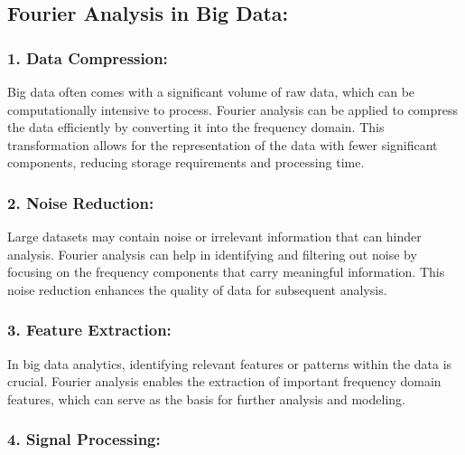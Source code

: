 \documentclass[11pt]{article}
\begin{document}
\hypertarget{fourier-analysis-in-big-data}{%
\subsection{Fourier Analysis in Big
Data:}\label{fourier-analysis-in-big-data}}

\hypertarget{data-compression}{%
\subsubsection{\texorpdfstring{\textbf{1. Data
Compression:}}{1. Data Compression:}}\label{data-compression}}

Big data often comes with a significant volume of raw data, which can be
computationally intensive to process. Fourier analysis can be applied to
compress the data efficiently by converting it into the frequency
domain. This transformation allows for the representation of the data
with fewer significant components, reducing storage requirements and
processing time.

\hypertarget{noise-reduction}{%
\subsubsection{\texorpdfstring{\textbf{2. Noise
Reduction:}}{2. Noise Reduction:}}\label{noise-reduction}}

Large datasets may contain noise or irrelevant information that can
hinder analysis. Fourier analysis can help in identifying and filtering
out noise by focusing on the frequency components that carry meaningful
information. This noise reduction enhances the quality of data for
subsequent analysis.

\hypertarget{feature-extraction}{%
\subsubsection{\texorpdfstring{\textbf{3. Feature
Extraction:}}{3. Feature Extraction:}}\label{feature-extraction}}

In big data analytics, identifying relevant features or patterns within
the data is crucial. Fourier analysis enables the extraction of
important frequency domain features, which can serve as the basis for
further analysis and modeling.

\hypertarget{signal-processing}{%
\subsubsection{\texorpdfstring{\textbf{4. Signal
Processing:}}{4. Signal Processing:}}\label{signal-processing}}
\end{document}
